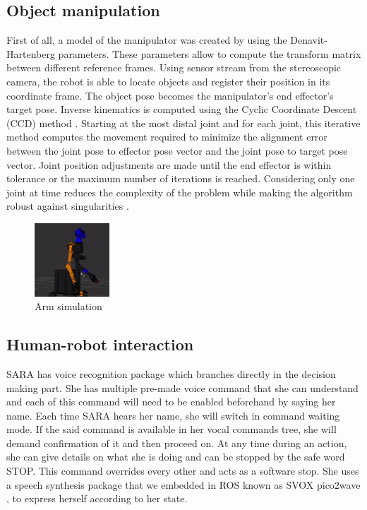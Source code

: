 \documentclass[runningheads,a4paper]{llncs}
\begin{document}
\subsection{Object manipulation}
\tab First of all, a model of the manipulator was created by using the Denavit-Hartenberg \cite{kinematic} parameters. These parameters allow to compute the transform matrix between different reference frames. Using sensor stream from the stereoscopic camera, the robot is able to locate objects and register their position in its coordinate frame. The object pose becomes the manipulator's end effector's target pose. Inverse kinematics is computed using the Cyclic Coordinate Descent (CCD) method \cite{coordinate}. Starting at the most distal joint and for each joint, this iterative method computes the movement required to minimize the alignment error between the joint pose to effector pose vector and the joint pose to target pose vector. Joint position adjustments are made until the end effector is within tolerance or the maximum number of iterations is reached. Considering only one joint at time reduces the complexity of the problem while making the algorithm robust against singularities \cite{springer}. 
\begin{figure}
\centering
\includegraphics[width=0.25\textwidth]{images/arm_sim.png}
\caption{Arm simulation}
\end{figure}

\newpage
\subsection{Human-robot interaction}
\tab SARA has voice recognition package which branches directly in the decision making part. She has multiple pre-made voice command that she can understand and each of this command will need to be enabled beforehand by saying her name. Each time SARA hears her name, she will switch in command waiting mode. If the said command is available in her vocal commands tree, she will demand confirmation of it and then proceed on. At any time during an action, she can give details on what she is doing and can be stopped by the safe word STOP. This command overrides every other and acts as a software stop. She uses a speech synthesis package that we embedded in ROS known as SVOX pico2wave \cite{svox}, to express herself according to her state.\\
\end{document}
